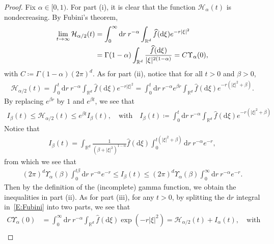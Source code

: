 \documentclass[sn-mathphys]{sn-jnl}%
\renewcommand{\R}{\mathbb{R}}
\newcommand{\ud}{\ensuremath{\mathrm{d}}}
\numberwithin{equation}{section}
\theoremstyle{thmstyleone}%
\theoremstyle{thmstyletwo}%
\theoremstyle{thmstylethree}%
\begin{document}
\begin{proof}
  Fix $\alpha\in[0,1)$. For part (i), it is clear that the function $\mathcal{H}_\alpha(t)$ is
  nondecreasing. By Fubini's theorem,
  \begin{align}\label{E:Fubini}
    \lim_{t\to\infty}\mathcal{H}_{\alpha/2}(t)
    & = \int_0^\infty \ud r \: r^{-\alpha} \int_{\R^d} \widehat{f}(\ud\xi)e^{-r\lvert\xi\rvert^2} \notag \\
    & = \Gamma(1-\alpha) \int_{\R^d} \frac{\widehat{f}(\ud\xi)}{\lvert\xi\rvert^{2\left(1-\alpha\right)}}
      = C \Upsilon_{\alpha}(0),
  \end{align}
  with $C\coloneqq \Gamma(1-\alpha)(2\pi)^d$. As for part (ii), notice that for all $t>0$ and
  $\beta>0$,
  \begin{align*}
    \mathcal{H}_{\alpha /2}(t)
    = \int_0^t \ud r\: r^{-\alpha} \int_{\R^d} \widehat{f}(\ud\xi)e^{-r\lvert\xi\rvert^2}
    = \int_0^t \ud r\: r^{-\alpha} e^{\beta r} \int_{\R^d} \widehat{f}(\ud\xi)e^{-r\left(\lvert\xi\rvert^2 +\beta\right)}.
  \end{align*}
  By replacing $e^{\beta r}$ by $1$ and $e^{\beta t}$, we see that
  \begin{align*}
    I_\beta(t)
    \le \mathcal{H}_{\alpha /2}(t)
    \le e^{\beta t} I_\beta(t), \quad \text{with} \quad
    I_\beta(t)\coloneqq
    \int_0^t \ud r\: r^{-\alpha} \int_{\R^d} \widehat{f}(\ud\xi)e^{-r\left(\lvert\xi\rvert^2+\beta\right)}
  \end{align*}
   Notice that
  \begin{align*}
    I_\beta(t)
    = \int_{\R^d} \frac{1}{\left(\beta+\lvert\xi\rvert^2\right)^{1-\alpha}} \widehat{f}(\ud\xi)
      \int_{0}^{t\left(\lvert\xi\rvert^2 + \beta\right)} \ud r\: r^{-\alpha} e^{-r},
  \end{align*}
  from which we see that
  \begin{align*}
    \left(2\pi\right)^d\Upsilon_\alpha(\beta) \int_{0}^{t \beta} \ud r\: r^{-\alpha} e^{-r}
    \le I_\beta(t) \le
    \left(2\pi\right)^d\Upsilon_\alpha(\beta) \int_{0}^{\infty} \ud r\: r^{-\alpha} e^{-r}.
  \end{align*}
  Then by the definition of the (incomplete) gamma function, we obtain the inequalities in part
(ii). As for part (iii), for any $t>0$, by splitting the $\ud r$ integral in~\eqref{E:Fubini} into
two parts, we see that
  \begin{align*}
    C \Upsilon_{\alpha}(0) & = \int_0^\infty \ud r \: r^{-\alpha} \int_{\R^d} \widehat{f}(\ud\xi)\exp\left(-r\lvert\xi\rvert^2\right) = \mathcal{H}_{\alpha/2}(t) + I_\alpha(t), \quad \text{with} \\

\end{align*}
\end{proof}
\end{document}
